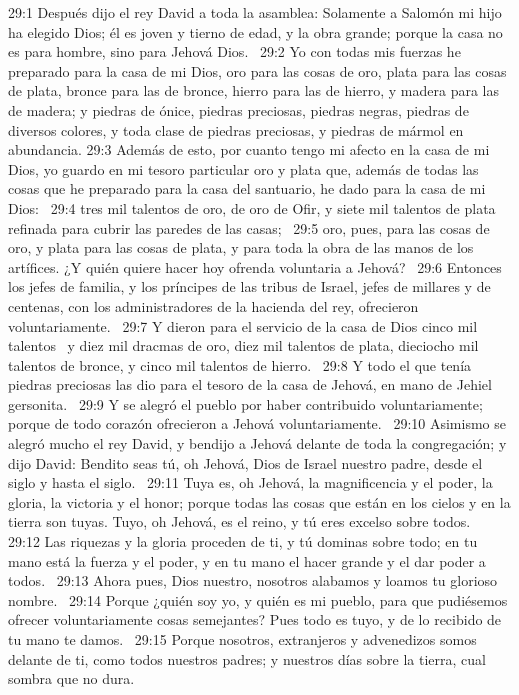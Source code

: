 29:1 Después dijo el rey David a toda la asamblea: Solamente a Salomón mi hijo ha elegido Dios; él es joven y tierno de edad, y la obra grande; porque la casa no es para hombre, sino para Jehová Dios.  
29:2 Yo con todas mis fuerzas he preparado para la casa de mi Dios, oro para las cosas de oro, plata para las cosas de plata, bronce para las de bronce, hierro para las de hierro, y madera para las de madera; y piedras de ónice, piedras preciosas, piedras negras, piedras de diversos colores, y toda clase de piedras preciosas, y piedras de mármol en abundancia. 
29:3 Además de esto, por cuanto tengo mi afecto en la casa de mi Dios, yo guardo en mi tesoro particular oro y plata que, además de todas las cosas que he preparado para la casa del santuario, he dado para la casa de mi Dios:  
29:4 tres mil talentos de oro, de oro de Ofir, y siete mil talentos de plata refinada para cubrir las paredes de las casas;  
29:5 oro, pues, para las cosas de oro, y plata para las cosas de plata, y para toda la obra de las manos de los artífices. ¿Y quién quiere hacer hoy ofrenda voluntaria a Jehová?  
29:6 Entonces los jefes de familia, y los príncipes de las tribus de Israel, jefes de millares y de centenas, con los administradores de la hacienda del rey, ofrecieron voluntariamente.  
29:7 Y dieron para el servicio de la casa de Dios cinco mil talentos  y diez mil dracmas de oro, diez mil talentos de plata, dieciocho mil talentos de bronce, y cinco mil talentos de hierro.  
29:8 Y todo el que tenía piedras preciosas las dio para el tesoro de la casa de Jehová, en mano de Jehiel gersonita.  
29:9 Y se alegró el pueblo por haber contribuido voluntariamente; porque de todo corazón ofrecieron a Jehová voluntariamente.  
29:10 Asimismo se alegró mucho el rey David, y bendijo a Jehová delante de toda la congregación; y dijo David: Bendito seas tú, oh Jehová, Dios de Israel nuestro padre, desde el siglo y hasta el siglo.  
29:11 Tuya es, oh Jehová, la magnificencia y el poder, la gloria, la victoria y el honor; porque todas las cosas que están en los cielos y en la tierra son tuyas. Tuyo, oh Jehová, es el reino, y tú eres excelso sobre todos.  
29:12 Las riquezas y la gloria proceden de ti, y tú dominas sobre todo; en tu mano está la fuerza y el poder, y en tu mano el hacer grande y el dar poder a todos.  
29:13 Ahora pues, Dios nuestro, nosotros alabamos y loamos tu glorioso nombre.  
29:14 Porque ¿quién soy yo, y quién es mi pueblo, para que pudiésemos ofrecer voluntariamente cosas semejantes? Pues todo es tuyo, y de lo recibido de tu mano te damos.  
29:15 Porque nosotros, extranjeros y advenedizos somos delante de ti, como todos nuestros padres; y nuestros días sobre la tierra, cual sombra que no dura.  
